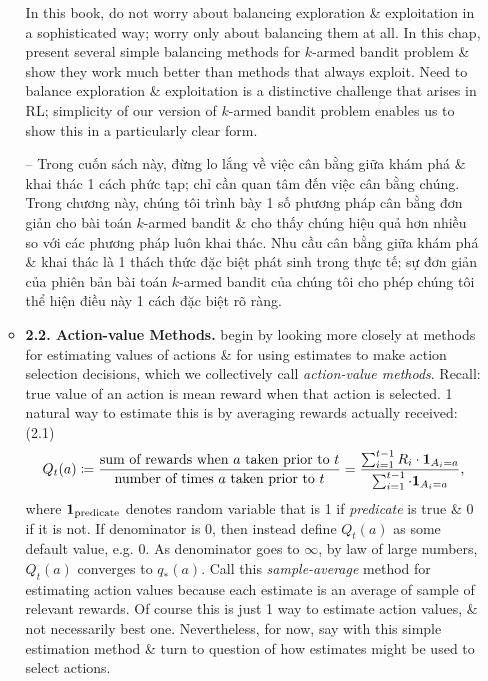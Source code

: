 \documentclass{article}
\begin{document}
\begin{itemize}
\begin{itemize}
        In this book, do not worry about balancing exploration \& exploitation in a sophisticated way; worry only about balancing them at all. In this chap, present several simple balancing methods for $k$-armed bandit problem \& show they work much better than methods that always exploit. Need to balance exploration \& exploitation is a distinctive challenge that arises in RL; simplicity of our version of $k$-armed bandit problem enables us to show this in a particularly clear form.

        -- Trong cuốn sách này, đừng lo lắng về việc cân bằng giữa khám phá \& khai thác 1 cách phức tạp; chỉ cần quan tâm đến việc cân bằng chúng. Trong chương này, chúng tôi trình bày 1 số phương pháp cân bằng đơn giản cho bài toán $k$-armed bandit \& cho thấy chúng hiệu quả hơn nhiều so với các phương pháp luôn khai thác. Nhu cầu cân bằng giữa khám phá \& khai thác là 1 thách thức đặc biệt phát sinh trong thực tế; sự đơn giản của phiên bản bài toán $k$-armed bandit của chúng tôi cho phép chúng tôi thể hiện điều này 1 cách đặc biệt rõ ràng.
        \item {\bf2.2. Action-value Methods.} begin by looking more closely at methods for estimating values of actions \& for using estimates to make action selection decisions, which we collectively call {\it action-value methods}. Recall: true value of an action is mean reward when that action is selected. 1 natural way to estimate this is by averaging rewards actually received: (2.1)
        \begin{equation*}
            Q_t(a)\coloneqq\frac{\mbox{sum of rewards when } a \mbox{ taken prior to } t}{\mbox{number of times } a \mbox{ taken prior to } t} = \frac{\sum_{i=1}^{t-1} R_i\cdot{\bf1}_{A_i = a}}{\sum_{i=1}^{t-1} \cdot{\bf1}_{A_i = a}},
        \end{equation*}
        where ${\bf1}_{\rm predicate}$ denotes random variable that is 1 if {\it predicate} is true \& 0 if it is not. If denominator is 0, then instead define $Q_t(a)$ as some default value, e.g. 0. As denominator goes to $\infty$, by law of large numbers, $Q_t(a)$ converges to $q_*(a)$. Call this {\it sample-average} method for estimating action values because each estimate is an average of sample of relevant rewards. Of course this is just 1 way to estimate action values, \& not necessarily best one. Nevertheless, for now, say with this simple estimation method \& turn to question of how estimates might be used to select actions.


\end{itemize}
\end{itemize}
\end{document}
